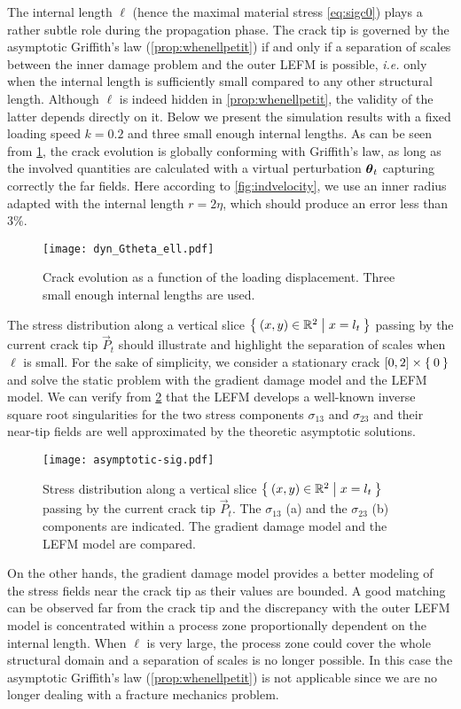 The internal length $\ell$ (hence the maximal material stress \eqref{eq:sigc0}) plays a rather subtle role during the propagation phase. The crack tip is governed by the asymptotic Griffith's law (\cref{prop:whenellpetit}) if and only if a separation of scales between the inner damage problem and the outer LEFM is possible, \emph{i.e.} only when the internal length is sufficiently small compared to any other structural length. Although $\ell$ is indeed hidden in \cref{prop:whenellpetit}, the validity of the latter depends directly on it. Below we present the simulation results with a fixed loading speed $k=0.2$ and three small enough internal lengths. As can be seen from \cref{fig:evoGtGcell}, the crack evolution is globally conforming with Griffith's law, as long as the involved quantities are calculated with a virtual perturbation $\vtheta_t$ capturing correctly the far fields. Here according to \cref{fig:indvelocity}, we use an inner radius adapted with the internal length $r=2\eta$, which should produce an error less than $3\%$.
\begin{figure}[htbp]
\centering
\texttt{[image: dyn\_Gtheta\_ell.pdf]}
\caption{Crack evolution as a function of the loading displacement. Three small enough internal lengths are used.} \label{fig:evoGtGcell}
\end{figure}

The stress distribution along a vertical slice $\Set{(x,y)\in\mathbb{R}^2|x=l_t}$ passing by the current crack tip $\vec{P}_t$ should illustrate and highlight the separation of scales when $\ell$ is small. For the sake of simplicity, we consider a stationary crack $[0,2]\times\Set{0}$ and solve the static problem with the gradient damage model and the LEFM model. We can verify from \cref{fig:stress} that the LEFM develops a well-known inverse square root singularities for the two stress components $\sigma_{13}$ and $\sigma_{23}$ and their near-tip fields are well approximated by the theoretic asymptotic solutions.
\begin{figure}[htbp]
\centering
\texttt{[image: asymptotic-sig.pdf]}
\caption{Stress distribution along a vertical slice $\Set{(x,y)\in\mathbb{R}^2|x=l_t}$ passing by the current crack tip $\vec{P}_t$. The $\sigma_{13}$ (a) and the $\sigma_{23}$ (b) components are indicated. The gradient damage model and the LEFM model are compared.} \label{fig:stress}
\end{figure}
On the other hands, the gradient damage model provides a better modeling of the stress fields near the crack tip as their values are bounded. A good matching can be observed far from the crack tip and the discrepancy with the outer LEFM model is concentrated within a process zone proportionally dependent on the internal length. When $\ell$ is very large, the process zone could cover the whole structural domain and a separation of scales is no longer possible. In this case the asymptotic Griffith's law (\cref{prop:whenellpetit}) is not applicable since we are no longer dealing with a fracture mechanics problem.

